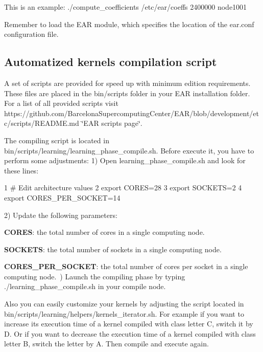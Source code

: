 This is an example\+: {\ttfamily ./compute\+\_\+coefficients /etc/ear/coeffs 2400000 node1001}

Remember to load the E\+AR module, which specifies the location of the {\ttfamily ear.\+conf} configuration file.

\subsection*{Automatized kernels compilation script }

A set of scripts are provided for speed up with minimum edition requirements. These files are placed in the {\ttfamily bin/scripts} folder in your E\+AR installation folder. For a list of all provided scripts visit https\+://github.com/\+Barcelona\+Supercomputing\+Center/\+E\+A\+R/blob/development/etc/scripts/\+R\+E\+A\+D\+M\+E.\+md \char`\"{}\+E\+A\+R scripts page\char`\"{}.

The compiling script is located in {\ttfamily bin/scripts/learning/learning\+\_\+phase\+\_\+compile.\+sh}. Before execute it, you have to perform some adjustments\+: 1) Open {\ttfamily learning\+\_\+phase\+\_\+compile.\+sh} and look for these lines\+: 
\begin{DoxyCode}
1 # Edit architecture values
2 export CORES=28
3 export SOCKETS=2
4 export CORES\_PER\_SOCKET=14
\end{DoxyCode}
 2) Update the following parameters\+:~\newline

\begin{DoxyItemize}
\item {\bfseries C\+O\+R\+ES}\+: the total number of cores in a single computing node.~\newline

\item {\bfseries S\+O\+C\+K\+E\+TS}\+: the total number of sockets in a single computing node.~\newline

\item {\bfseries C\+O\+R\+E\+S\+\_\+\+P\+E\+R\+\_\+\+S\+O\+C\+K\+ET}\+: the total number of cores per socket in a single computing node.~) Launch the compiling phase by typing {\ttfamily ./learning\+\_\+phase\+\_\+compile.sh} in your compile node.
\end{DoxyItemize}

Also you can easily customize your kernels by adjusting the script located in {\ttfamily bin/scripts/learning/helpers/kernels\+\_\+iterator.\+sh}. For example if you want to increase its execution time of a kernel compiled with class letter C, switch it by D. Or if you want to decrease the execution time of a kernel compiled with class letter B, switch the letter by A. Then compile and execute again.

